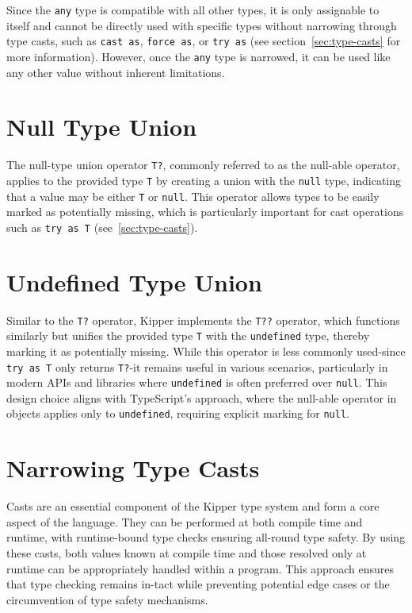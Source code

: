 Since the \lstinline|any| type is compatible with all other types, it is only assignable to itself and cannot be directly used with specific types without narrowing through type casts, such as \lstinline|cast as|, \lstinline|force as|, or \lstinline|try as| (see section~\ref{sec:type-casts} for more information). However, once the \lstinline|any| type is narrowed, it can be used like any other value without inherent limitations.

\section{Null Type Union}
\label{sec:null-type-union}

The null-type union operator \lstinline|T?|, commonly referred to as the null-able operator, applies to the provided type \lstinline|T| by creating a union with the \lstinline|null| type, indicating that a value may be either \lstinline|T| or \lstinline|null|. This operator allows types to be easily marked as potentially missing, which is particularly important for cast operations such as \lstinline|try as T| (see~\ref{sec:type-casts}).

\section{Undefined Type Union}
\label{sec:undefined-type-union}

Similar to the \lstinline|T?| operator, Kipper implements the \lstinline|T??| operator, which functions similarly but unifies the provided type \lstinline|T| with the \lstinline|undefined| type, thereby marking it as potentially missing. While this operator is less commonly used-since \lstinline|try as T| only returns \lstinline|T?|-it remains useful in various scenarios, particularly in modern APIs and libraries where \lstinline|undefined| is often preferred over \lstinline|null|. This design choice aligns with TypeScript's approach, where the null-able operator in objects applies only to \lstinline|undefined|, requiring explicit marking for \lstinline|null|.

\section{Narrowing Type Casts}
\label{sec:type-casts}

Casts are an essential component of the Kipper type system and form a core aspect of the language. They can be performed at both compile time and runtime, with runtime-bound type checks ensuring all-round type safety. By using these casts, both values known at compile time and those resolved only at runtime can be appropriately handled within a program. This approach ensures that type checking remains in-tact while preventing potential edge cases or the circumvention of type safety mechanisms.

